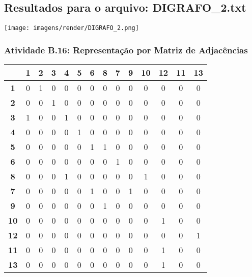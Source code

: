 \documentclass[a4paper,12pt]{article}
\begin{document}
\subsection{Resultados para o arquivo: DIGRAFO\_2.txt}

\begin{center}
    \texttt{[image: imagens/render/DIGRAFO\_2.png]}
\end{center}

\subsubsection*{Atividade B.16: Representação por Matriz de Adjacências}
\begin{center}
\scriptsize 
\begin{tabular*}{\textwidth}{c|@{\extracolsep{\fill}}ccccccccccccc}
\rowcolor[gray]{0.9}
 & \textbf{1} & \textbf{2} & \textbf{3} & \textbf{4} & \textbf{5} & \textbf{6} & \textbf{8} & \textbf{7} & \textbf{9} & \textbf{10} & \textbf{12} & \textbf{11} & \textbf{13} \\
\hline
\textbf{1} & 0 & 1 & 0 & 0 & 0 & 0 & 0 & 0 & 0 & 0 & 0 & 0 & 0 \\
\textbf{2} & 0 & 0 & 1 & 0 & 0 & 0 & 0 & 0 & 0 & 0 & 0 & 0 & 0 \\
\textbf{3} & 1 & 0 & 0 & 1 & 0 & 0 & 0 & 0 & 0 & 0 & 0 & 0 & 0 \\
\textbf{4} & 0 & 0 & 0 & 0 & 1 & 0 & 0 & 0 & 0 & 0 & 0 & 0 & 0 \\
\textbf{5} & 0 & 0 & 0 & 0 & 0 & 1 & 1 & 0 & 0 & 0 & 0 & 0 & 0 \\
\textbf{6} & 0 & 0 & 0 & 0 & 0 & 0 & 0 & 1 & 0 & 0 & 0 & 0 & 0 \\
\textbf{8} & 0 & 0 & 0 & 1 & 0 & 0 & 0 & 0 & 0 & 1 & 0 & 0 & 0 \\
\textbf{7} & 0 & 0 & 0 & 0 & 0 & 1 & 0 & 0 & 1 & 0 & 0 & 0 & 0 \\
\textbf{9} & 0 & 0 & 0 & 0 & 0 & 0 & 1 & 0 & 0 & 0 & 0 & 0 & 0 \\
\textbf{10} & 0 & 0 & 0 & 0 & 0 & 0 & 0 & 0 & 0 & 0 & 1 & 0 & 0 \\
\textbf{12} & 0 & 0 & 0 & 0 & 0 & 0 & 0 & 0 & 0 & 0 & 0 & 0 & 1 \\
\textbf{11} & 0 & 0 & 0 & 0 & 0 & 0 & 0 & 0 & 0 & 0 & 1 & 0 & 0 \\
\textbf{13} & 0 & 0 & 0 & 0 & 0 & 0 & 0 & 0 & 0 & 0 & 1 & 0 & 0 \\
\end{tabular*}
\end{center}
\end{document}
